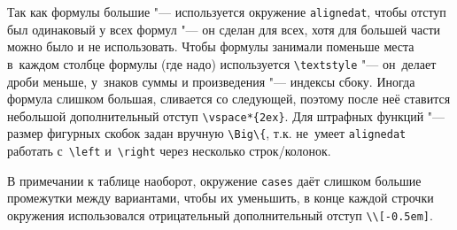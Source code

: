 Так как формулы большие "--- используется окружение \verb!alignedat!,
чтобы отступ был одинаковый у всех формул "--- он сделан для всех, хотя
для большей части можно было и не использовать.  Чтобы формулы
занимали поменьше места в~каждом столбце формулы (где надо)
используется \verb!\textstyle! "--- он~делает дроби меньше, у~знаков
суммы и произведения "--- индексы сбоку. Иногда формула слишком большая,
сливается со следующей, поэтому после неё ставится небольшой
дополнительный отступ \verb!\vspace*{2ex}!. Для штрафных функций "---
размер фигурных скобок задан вручную \verb!\Big\{!, т.\:к. не~умеет
\verb!alignedat! работать с~\verb!\left! и~\verb!\right! через
несколько строк/колонок.

В примечании к таблице наоборот, окружение \verb!cases! даёт слишком
большие промежутки между вариантами, чтобы их уменьшить, в конце
каждой строчки окружения использовался отрицательный дополнительный
отступ \verb!\\[-0.5em]!.

